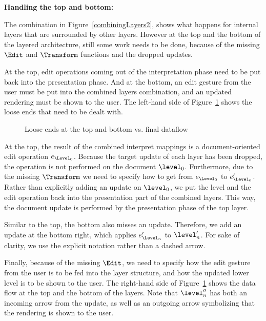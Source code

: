 \bigskip
{\bf Handling the top and bottom:}

The combination in Figure~\ref{combiningLayers2}, shows what happens for internal layers that are surrounded by other layers. However at the top and the bottom of the layered architecture, still some work needs to be done, because of the missing $\Edit$ and $\Transform$ functions and the dropped updates. 

At the top, edit operations coming out of the interpretation phase need to be put back into the presentation phase. And at the bottom, an edit gesture from the user must be put into the combined layers combination, and an updated rendering must be shown to the user. The left-hand side of Figure~\ref{topAndBottom} shows the loose ends that need to be dealt with.

\begin{figure}\begin{center}\begin{center}
\end{center}
\caption{Loose ends at the top and bottom vs. final dataflow}\label{topAndBottom} 
\end{center}\end{figure}


At the top, the result of the combined interpret mappings is a document-oriented edit operation $e_{\Level_0}$. Because the target update of each layer has been dropped, the operation is not performed on the document $\level_0$. Furthermore, due to the missing $\Transform$ we need to specify how to get from $e_{\Level_0}$ to $e'_{\Level_0}$. Rather than explicitly adding an update on $\level_0$, we put the level and the edit operation back into the presentation part of the combined layers. This way, the document update is performed by the presentation phase of the top layer.

Similar to the top, the bottom also misses an update. Therefore, we add an update at the bottom right, which applies $e'_{\Level_n}$ to $\level'_n$. For sake of clarity, we use the explicit notation rather than a dashed arrow. 

Finally, because of the missing $\Edit$, we need to specify how the edit gesture from the user is to be fed into the layer structure, and how the updated lower level is to be shown to the user. The right-hand side of Figure~\ref{topAndBottom} shows the data flow at the top and the bottom of the layers. Note that $\level''_n$ has both an incoming arrow from the update, as well as an outgoing arrow symbolizing that the rendering is shown to the user.

